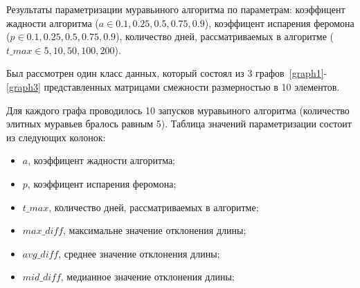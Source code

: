 
Результаты параметризации муравьиного алгоритма по параметрам:  коэффицент жадности алгоритма ($a \in {0.1, 0.25, 0.5, 0.75, 0.9}$), коэффицент испарения феромона ($p \in {0.1, 0.25, 0.5, 0.75, 0.9}$), количество дней, рассматриваемых в алгоритме ($t\_max \in {5, 10, 50, 100, 200}$).

Был рассмотрен один класс данных, который состоял из 3 графов~\ref{graph1}-\ref{graph3} представленных матрицами смежности размерностью в 10 элементов. 

Для каждого графа проводилось 10 запусков муравьиного алгоритма (количество элитных муравьев бралось равным 5). Таблица значений параметризации состоит из следующих колонок:
\begin{itemize}
	\item $a$, коэффицент жадности алгоритма;
	\item $p$, коэффицент испарения феромона;
	\item $t\_max$, количество дней, рассматриваемых в алгоритме;
	\item $max\_diff$, максимальне значение отклонения длины;
	\item $avg\_diff$, среднее значение отклонения длины;
	\item $mid\_diff $, медианное значение отклонения длины;
\end{itemize}

